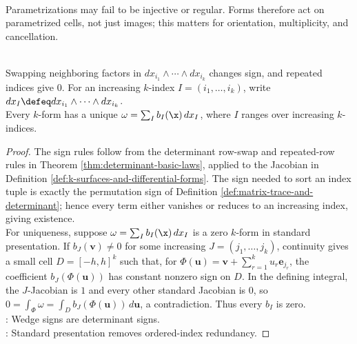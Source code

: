 \begin{remark} \label{rem:parametrized-cells-not-images} \\
Parametrizations may fail to be injective or regular. Forms therefore act on parametrized cells, not just images; this matters for orientation, multiplicity, and cancellation.
\end{remark}

\begin{proposition} \label{prop:basic-forms-standard-presentation} \\
Swapping neighboring factors in $dx_{i_1}\wedge\cdots\wedge dx_{i_k}$ changes sign, and repeated indices give $0$. For an increasing $k$-index $I=(i_1,\ldots,i_k)$, write $dx_I\defeq dx_{i_1}\wedge\cdots\wedge dx_{i_k}$.\\
Every $k$-form has a unique  $\omega=\sum_I b_I(\x)\,dx_I$, where $I$ ranges over increasing $k$-indices.
\begin{proof}
The sign rules follow from the determinant row-swap and repeated-row rules in Theorem \ref{thm:determinant-basic-laws}, applied to the Jacobian in Definition \ref{def:k-surfaces-and-differential-forms}. The sign needed to sort an index tuple is exactly the permutation sign of Definition \ref{def:matrix-trace-and-determinant}; hence every term either vanishes or reduces to an increasing index, giving existence.\\
For uniqueness, suppose $\omega=\sum_I b_I(\x)\,dx_I$ is a zero $k$-form in standard presentation. If $b_J(\mathbf{v})\neq0$ for some increasing $J=(j_1,\ldots,j_k)$, continuity gives a small cell $D=[-h,h]^k$ such that, for $\Phi(\mathbf{u})=\mathbf{v}+\sum\limits_{r=1}^{k}u_r\mathbf{e}_{j_r}$, the coefficient $b_J(\Phi(\mathbf{u}))$ has constant nonzero sign on $D$. In the defining integral, the $J$-Jacobian is $1$ and every other standard Jacobian is $0$, so $0=\int_{\Phi}\omega=\int_D b_J(\Phi(\mathbf{u}))\,d\mathbf{u}$, a contradiction. Thus every $b_I$ is zero.\\
: Wedge signs are determinant signs.\\
: Standard presentation removes ordered-index redundancy.
\end{proof}
\end{proposition}

